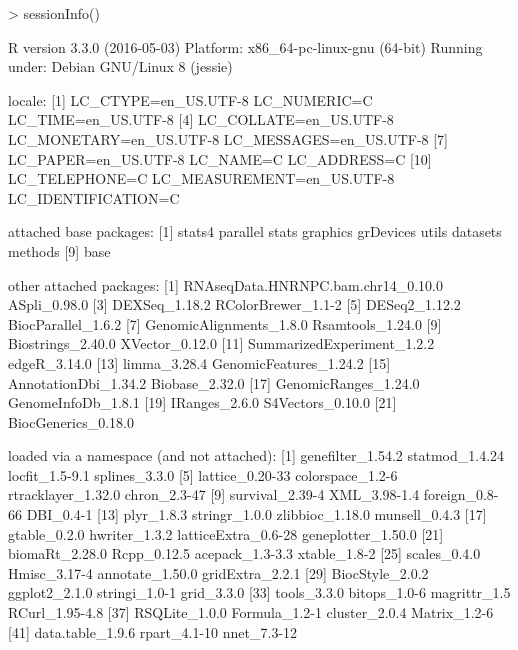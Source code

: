 \documentclass{article}
\begin{document}
\begin{Schunk}
\begin{Sinput}
> sessionInfo()
\end{Sinput}
\begin{Soutput}
R version 3.3.0 (2016-05-03)
Platform: x86_64-pc-linux-gnu (64-bit)
Running under: Debian GNU/Linux 8 (jessie)

locale:
 [1] LC_CTYPE=en_US.UTF-8       LC_NUMERIC=C               LC_TIME=en_US.UTF-8       
 [4] LC_COLLATE=en_US.UTF-8     LC_MONETARY=en_US.UTF-8    LC_MESSAGES=en_US.UTF-8   
 [7] LC_PAPER=en_US.UTF-8       LC_NAME=C                  LC_ADDRESS=C              
[10] LC_TELEPHONE=C             LC_MEASUREMENT=en_US.UTF-8 LC_IDENTIFICATION=C       

attached base packages:
[1] stats4    parallel  stats     graphics  grDevices utils     datasets  methods  
[9] base     

other attached packages:
 [1] RNAseqData.HNRNPC.bam.chr14_0.10.0 ASpli_0.98.0                      
 [3] DEXSeq_1.18.2                      RColorBrewer_1.1-2                
 [5] DESeq2_1.12.2                      BiocParallel_1.6.2                
 [7] GenomicAlignments_1.8.0            Rsamtools_1.24.0                  
 [9] Biostrings_2.40.0                  XVector_0.12.0                    
[11] SummarizedExperiment_1.2.2         edgeR_3.14.0                      
[13] limma_3.28.4                       GenomicFeatures_1.24.2            
[15] AnnotationDbi_1.34.2               Biobase_2.32.0                    
[17] GenomicRanges_1.24.0               GenomeInfoDb_1.8.1                
[19] IRanges_2.6.0                      S4Vectors_0.10.0                  
[21] BiocGenerics_0.18.0               

loaded via a namespace (and not attached):
 [1] genefilter_1.54.2   statmod_1.4.24      locfit_1.5-9.1      splines_3.3.0      
 [5] lattice_0.20-33     colorspace_1.2-6    rtracklayer_1.32.0  chron_2.3-47       
 [9] survival_2.39-4     XML_3.98-1.4        foreign_0.8-66      DBI_0.4-1          
[13] plyr_1.8.3          stringr_1.0.0       zlibbioc_1.18.0     munsell_0.4.3      
[17] gtable_0.2.0        hwriter_1.3.2       latticeExtra_0.6-28 geneplotter_1.50.0 
[21] biomaRt_2.28.0      Rcpp_0.12.5         acepack_1.3-3.3     xtable_1.8-2       
[25] scales_0.4.0        Hmisc_3.17-4        annotate_1.50.0     gridExtra_2.2.1    
[29] BiocStyle_2.0.2     ggplot2_2.1.0       stringi_1.0-1       grid_3.3.0         
[33] tools_3.3.0         bitops_1.0-6        magrittr_1.5        RCurl_1.95-4.8     
[37] RSQLite_1.0.0       Formula_1.2-1       cluster_2.0.4       Matrix_1.2-6       
[41] data.table_1.9.6    rpart_4.1-10        nnet_7.3-12        
\end{Soutput}
\end{Schunk}




\end{document}
